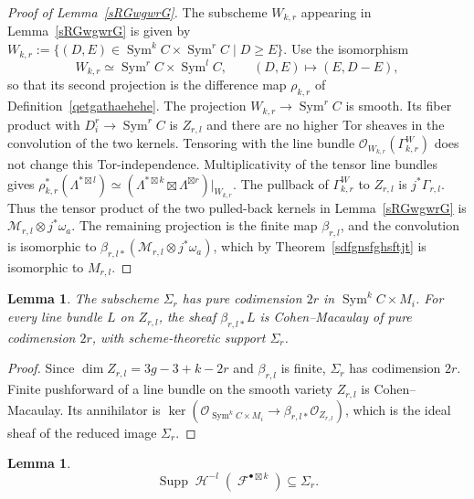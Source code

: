 \documentclass[11pt,letterpaper]{amsart}
\theoremstyle{plain}
\newtheorem{lemma}[theorem]{Lemma}
\theoremstyle{definition}
\theoremstyle{remark}
\numberwithin{equation}{section}
\DeclareMathOperator{\Sym}{Sym}
\DeclareMathOperator{\cH}{\mathcal{H}}
\DeclareMathOperator{\cF}{\mathcal{F}}
\DeclareMathOperator{\Supp}{Supp}
\begin{document}
\begin{proof}[Proof of Lemma~\ref{sRGwgwrG}]
The subscheme $W_{k,r}$ appearing in 
Lemma~\ref{sRGwgwrG} is given by $W_{k,r}:=
 \{(D,E)\in\operatorname{Sym}^kC\times\operatorname{Sym}^rC
       \mid D\ge E\}$.
Use the isomorphism
\[
 W_{k,r}\simeq\Sym^rC\times\Sym^lC,\qquad
 (D,E)\longmapsto(E,D-E),
\]
so that its second projection is the difference map
$\rho_{k,r}$ of Definition~\ref{qetgathaehehe}.
The projection $W_{k,r}\to \Sym^rC$ is smooth.  Its fiber product with
$D_i^r\to\Sym^rC$ is $Z_{r,l}$ and there are no higher Tor sheaves
in the convolution of the two kernels.  Tensoring with the line
bundle $\mathcal O_{W_{k,r}}(\Gamma^W_{k,r})$ does not change this
Tor-independence.  Multiplicativity of the tensor line bundles gives
$\rho_{k,r}^*(\Lambda^{*\boxtimes l})\simeq
 \left(\Lambda^{*\boxtimes k}\boxtimes\Lambda^{\boxtimes r}\right)
       |_{W_{k,r}}$.
The pullback of $\Gamma^W_{k,r}$ to $Z_{r,l}$ is $j^*\Gamma_{r,l}$.
Thus the tensor product of the two pulled-back kernels in Lemma~\ref{sRGwgwrG} is
$\mathscr M_{r,l}\otimes j^*\omega_a$.
The remaining projection is the finite map $\beta_{r,l}$, and the
convolution is isomorphic to 
$\beta_{r,l*}(\mathscr M_{r,l}\otimes j^*\omega_a)$, which by Theorem~\ref{sdfgnsfghsftjt} is isomorphic
 to $M_{r,l}$.
\end{proof}






\begin{lemma}\label{lem:CMcandidate}
The subscheme $\Sigma_r$ has pure codimension $2r$ in ${\Sym^kC\times M_i}$.
For every line bundle $L$ on $Z_{r,l}$,
the sheaf $\beta_{r,l*}L$
is Cohen--Macaulay of pure codimension $2r$, with scheme-theoretic
support $\Sigma_r$.
\end{lemma}




\begin{proof}
Since $\dim Z_{r,l}=3g-3+k-2r$ and $\beta_{r,l}$ is finite,
$\Sigma_r$ has codimension $2r$. Finite pushforward of a line
bundle on the smooth variety $Z_{r,l}$ is Cohen--Macaulay.
Its annihilator is
$\ker(\mathcal O_{\Sym^kC\times M_i}\to\beta_{r,l*}\mathcal O_{Z_{r,l}})$,
which is the ideal sheaf of the reduced image $\Sigma_r$.
\end{proof}




\begin{lemma}\label{lem:altbound}\label{prop:support}
\begin{equation}\label{eq:support}
 \Supp\cH^{-l}({\cF^{\bullet\boxtimes k}})\subseteq\Sigma_r.
\end{equation}
\end{lemma}
\end{document}
